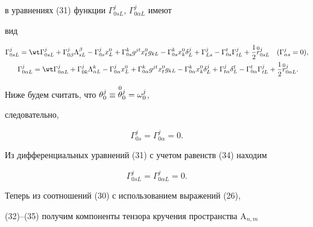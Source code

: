 в уравнениях (31) функции $\Gamma^j_{0s L}$, $\Gamma^j_{0\alpha L}$ имеют 


вид 


\begin{gather} 


\Gamma^j_{0s L}=\wt\Gamma^j_{0s L}+\Gamma^j_{0\beta} 


\Lambda^\beta_{s L}-\Gamma^j_{0s}x^0_L+\Gamma^k_{0s} 


g^{j t}x^0_t g_{k L}-\Gamma^k_{0s}x^0_k\delta^j_L+ 


\Gamma^j_{L s}-\Gamma^t_{0s}\Gamma^j_{t L}+\frac{1}{2} 


\up{0}{r}^j_{0s L}\quad (\Gamma^j_{\alpha s}=0),\\\ 


% 


\Gamma^j_{0\alpha L}=\wt\Gamma^j_{0\alpha L} +\Gamma^j_{0k}


\Lambda^k_{\alpha L}-\Gamma^j_{0\alpha}x^0_L+ 


\Gamma^k_{0\alpha}g^{j t}x^0_t g_{k L}- 


\Gamma^k_{0\alpha}x^0_k \delta^j_L+\Gamma^j_{t\alpha} 


\delta^t_L-\Gamma^t_{0\alpha}\Gamma^j_{t L}+\frac{1}{2} 


\up{0}{r}^j_{0\alpha L}. 


\end{gather} 


 


Ниже будем считать, что $\theta^j_0\equiv\overset{0}{\theta}{}^j_0=\omega^j_0$,


следовательно, 


\begin{equation} 


\Gamma^j_{0s}=\Gamma^j_{0\alpha}=0. 


\end{equation} 


Из дифференциальных уравнений (31) с учетом равенств (34) находим 


\begin{equation} 


\Gamma^j_{0s L}=\Gamma^j_{0\alpha L}=0. 


\end{equation} 


Теперь из соотношений (30) с использованием выражений (26), 


(32)--(35) получим компоненты тензора кручения пространства $\mathrm 


A_{n,m}$ 


